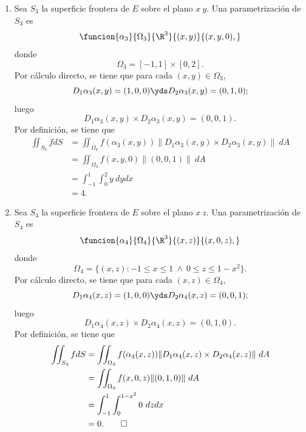 \documentclass[a4,11pt]{aleph-examen}
\begin{document}
\begin{preguntas}
\begin{respuesta}
\begin{respuesta}
\begin{respuesta}
\begin{enumerate}
\begin{respuesta}
\begin{enumerate}
        \item Sea $S_3$ la superficie frontera de $E$ sobre el plano $x\ y$. Una parametrización de $S_3$ es
        \[
            \funcion{\alpha_3}{\Omega_3}{\R^3}{(x,y)}{(x,y,0),}
        \]
        donde 
        \[
            \Omega_3=[-1,1]\times [0,2].
        \]
        Por cálculo directo, se tiene que para cada $(x,y)\in\Omega_3$,
        \[
            D_1\alpha_3(x,y)=(1,0,0)
            \yds 
            D_2\alpha_3(x,y)=(0,1,0);
        \]
        luego
        \[
            D_1\alpha_3(x,y)\times D_2\alpha_3(x,y)
            =(0,0,1).
        \]
        Por definición, se tiene que
        \begin{align*}
            \iint_{S_3} f dS
            &= \iint_{\Omega_3} f(\alpha_3(x,y)) \|D_1\alpha_3(x,y)\times D_2\alpha_3(x,y)\| \ dA\\
            &= \iint_{\Omega_3} f(x,y,0) \|(0,0,1)\| \ dA\\
            &= \int_{-1}^1 \int_0^{2} y \ dy dx\\
            &= 4.
        \end{align*}
        
        \item Sea $S_4$ la superficie frontera de $E$ sobre el plano $x\ z$. Una parametrización de $S_4$ es
        \[
            \funcion{\alpha_4}{\Omega_4}{\R^3}{(x,z)}{(x,0,z),}
        \]
        donde 
        \[
            \Omega_4=\{(x,z): -1\leq x\leq 1 \ \wedge \ 0\leq z\leq 1-x^2\}.
        \]
        Por cálculo directo, se tiene que para cada $(x,z)\in\Omega_4$,
        \[
            D_1\alpha_4(x,z)=(1,0,0)
            \yds 
            D_2\alpha_4(x,z)=(0,0,1);
        \]
        luego
        \[
            D_1\alpha_4(x,z)\times D_2\alpha_4(x,z)
            =(0,1,0).
        \]
        Por definición, se tiene que
        \begin{align*}
            \iint_{S_4} f dS
            &= \iint_{\Omega_4} f(\alpha_4(x,z)) \|D_1\alpha_4(x,z)\times D_2\alpha_4(x,z)\| \ dA\\
            &= \iint_{\Omega_4} f(x,0,z) \|(0,1,0)\| \ dA\\
            &= \int_{-1}^1 \int_0^{1-x^2} 0 \ dz dx\\
            &= 0.\qedhere
        \end{align*}        
    \end{enumerate}
\end{respuesta}



\end{enumerate}
\end{respuesta}
\end{respuesta}
\end{respuesta}
\end{preguntas}
\end{document}

